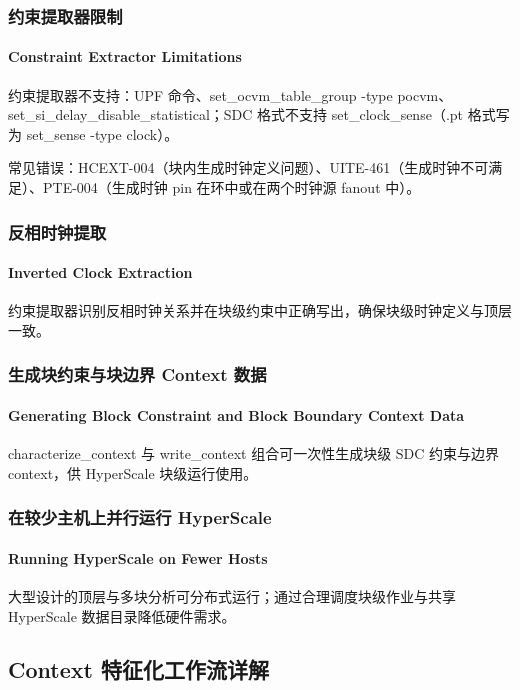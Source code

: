 \subsubsection{约束提取器限制}
\paragraph*{Constraint Extractor Limitations}

约束提取器不支持：UPF 命令、set_ocvm_table_group -type pocvm、set_si_delay_disable_statistical；SDC 格式不支持 set_clock_sense（.pt 格式写为 set_sense -type clock）。

常见错误：HCEXT-004（块内生成时钟定义问题）、UITE-461（生成时钟不可满足）、PTE-004（生成时钟 pin 在环中或在两个时钟源 fanout 中）。

\subsubsection{反相时钟提取}
\paragraph*{Inverted Clock Extraction}

约束提取器识别反相时钟关系并在块级约束中正确写出，确保块级时钟定义与顶层一致。

\subsubsection{生成块约束与块边界 Context 数据}
\paragraph*{Generating Block Constraint and Block Boundary Context Data}

characterize_context 与 write_context 组合可一次性生成块级 SDC 约束与边界 context，供 HyperScale 块级运行使用。

\subsubsection{在较少主机上并行运行 HyperScale}
\paragraph*{Running HyperScale on Fewer Hosts}

大型设计的顶层与多块分析可分布式运行；通过合理调度块级作业与共享 HyperScale 数据目录降低硬件需求。

\subsection{Context 特征化工作流详解}
